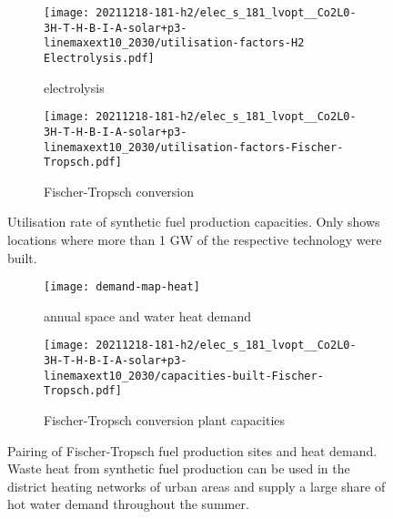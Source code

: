 \begin{figure}
    \centering
    \begin{subfigure}{0.66\textwidth}
        \centering
        \caption{electrolysis}
        \texttt{[image: 20211218-181-h2/elec\_s\_181\_lvopt\_\_Co2L0-3H-T-H-B-I-A-solar+p3-linemaxext10\_2030/utilisation-factors-H2 Electrolysis.pdf]}
    \end{subfigure}
    \begin{subfigure}{0.66\textwidth}
        \centering
        \caption{Fischer-Tropsch conversion}
        \texttt{[image: 20211218-181-h2/elec\_s\_181\_lvopt\_\_Co2L0-3H-T-H-B-I-A-solar+p3-linemaxext10\_2030/utilisation-factors-Fischer-Tropsch.pdf]}
    \end{subfigure}
    \caption{Utilisation rate of synthetic fuel production capacities. Only shows locations where more than 1 GW of the respective technology were built.}
    \label{fig:si:utilisation-rate-map}
\end{figure}

\begin{figure}
    \centering
    \begin{subfigure}{0.66\textwidth}
        \centering
        \caption{annual space and water heat demand}
        \texttt{[image: demand-map-heat]}
    \end{subfigure}
    \begin{subfigure}{0.66\textwidth}
        \centering
        \caption{Fischer-Tropsch conversion plant capacities}
        \texttt{[image: 20211218-181-h2/elec\_s\_181\_lvopt\_\_Co2L0-3H-T-H-B-I-A-solar+p3-linemaxext10\_2030/capacities-built-Fischer-Tropsch.pdf]}
    \end{subfigure}
    \caption{Pairing of Fischer-Tropsch fuel production sites and heat demand. Waste heat from synthetic fuel production can be used in the district heating networks of urban areas and supply a large share of hot water demand throughout the summer.}
    \label{fig:si:waste-heat-synfuels}
\end{figure}


